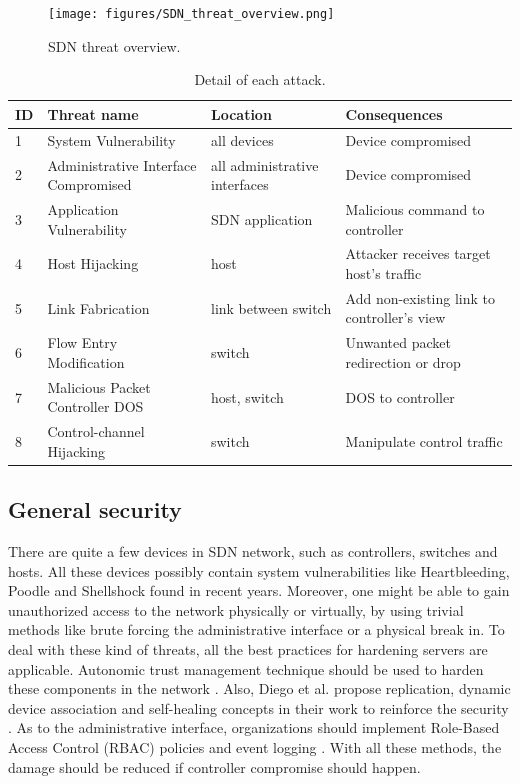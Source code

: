 \begin{figure}[H]
\begin{center} 
\texttt{[image: figures/SDN\_threat\_overview.png]}
\end{center}
\caption{SDN threat overview.}
\label{SND_threat_overview}
\end{figure}

\begin{table}[H]
\centering
\caption{Detail of each attack.}
\begin{tabular}{|l|p{4cm}|p{3.2cm}|p{5cm}|}
\hline ID & Threat name	& Location & Consequences \\
\hline
\hline 1 & System Vulnerability & all devices & Device compromised\\
\hline 2 & Administrative Interface Compromised & all administrative interfaces & Device compromised \\
\hline 3 & Application Vulnerability & SDN application & Malicious command to controller \\
\hline 4 & Host Hijacking & host & Attacker receives target host's traffic \\
\hline 5 & Link Fabrication & link between switch & Add non-existing link to controller's view \\
\hline 6 & Flow Entry Modification & switch & Unwanted packet redirection or drop \\
\hline 7 & Malicious Packet Controller DOS  & host, switch & DOS to controller \\
\hline 8 & Control-channel Hijacking & switch & Manipulate control traffic \\
\hline 
\end{tabular}
\label{table:sdn_threats}
\end{table}

\subsection{General security}
There are quite a few devices in SDN network, such as controllers, switches and hosts. All these devices possibly contain system vulnerabilities like Heartbleeding, Poodle and Shellshock \cite{HB,POODLE,SHELLSHOCK} found in recent years. Moreover, one might be able to gain unauthorized access to the network physically or virtually, by using trivial methods like brute forcing the administrative interface or a physical break in. To deal with these kind of threats, all the best practices for hardening servers are applicable. Autonomic trust management technique should be used to harden these components in the network \cite{YZP11}. Also, Diego et al. propose replication, dynamic device association and self-healing concepts in their work to reinforce the security \cite{KDFRV13}. As to the administrative interface, organizations should implement Role-Based Access Control (RBAC) policies and event logging \cite{FFR09}. With all these methods, the damage should be reduced if controller compromise should happen.

